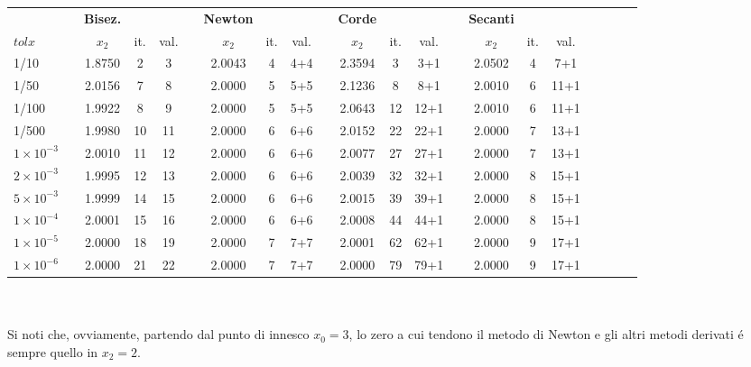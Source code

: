 \footnotesize\noindent\begin{tabular}{l*{20}{c}}
& \vline& \tiny\textbf{Bisez.} &     &      & \vline& \tiny\textbf{Newton} &     &      &\vline& \tiny\textbf{Corde} &    &      &\vline& \tiny\textbf{Secanti} \\
 \(tolx\) & \vline& \(x_2\)   & it. & val. & \vline& \(x_2\)   & it. & val.  &\vline& \(x_2\)  & it.& val. &\vline& \(x_2\) & it.&val.\\
\hline
 1/10                 &\vline& 1.8750 & 2  & 3  &\vline& 2.0043 & 4 & 4+4 &\vline& 2.3594 & 3 & 3+1  &\vline& 2.0502 & 4 & 7+1  \\
 1/50                 &\vline& 2.0156 & 7  & 8  &\vline& 2.0000 & 5 & 5+5 &\vline& 2.1236 & 8 & 8+1  &\vline& 2.0010 & 6 & 11+1 \\
 1/100                &\vline& 1.9922 & 8  & 9  &\vline& 2.0000 & 5 & 5+5 &\vline& 2.0643 & 12& 12+1 &\vline& 2.0010 & 6 & 11+1 \\
 1/500                &\vline& 1.9980 & 10 & 11 &\vline& 2.0000 & 6 & 6+6 &\vline& 2.0152 & 22& 22+1 &\vline& 2.0000 & 7 & 13+1 \\
 \(1 \times 10^{-3}\) &\vline& 2.0010 & 11 & 12 &\vline& 2.0000 & 6 & 6+6 &\vline& 2.0077 & 27& 27+1 &\vline& 2.0000 & 7 & 13+1 \\
 \(2 \times 10^{-3}\) &\vline& 1.9995 & 12 & 13 &\vline& 2.0000 & 6 & 6+6 &\vline& 2.0039 & 32& 32+1 &\vline& 2.0000 & 8 & 15+1 \\
 \(5 \times 10^{-3}\) &\vline& 1.9999 & 14 & 15 &\vline& 2.0000 & 6 & 6+6 &\vline& 2.0015 & 39& 39+1 &\vline& 2.0000 & 8 & 15+1 \\
 \(1 \times 10^{-4}\) &\vline& 2.0001 & 15 & 16 &\vline& 2.0000 & 6 & 6+6 &\vline& 2.0008 & 44& 44+1 &\vline& 2.0000 & 8 & 15+1 \\
 \(1 \times 10^{-5}\) &\vline& 2.0000 & 18 & 19 &\vline& 2.0000 & 7 & 7+7 &\vline& 2.0001 & 62& 62+1 &\vline& 2.0000 & 9 & 17+1  \\
 \(1 \times 10^{-6}\) &\vline& 2.0000 & 21 & 22 &\vline& 2.0000 & 7 & 7+7 &\vline& 2.0000 & 79& 79+1 &\vline& 2.0000 & 9 & 17+1  \\
\end{tabular}\\
\\

\normalsize\noindent Si noti che, ovviamente, partendo dal punto di innesco \(x_0 = 3\), lo zero a cui tendono il metodo di Newton e gli altri metodi derivati \'e sempre quello in \(x_2 = 2\).
\\

